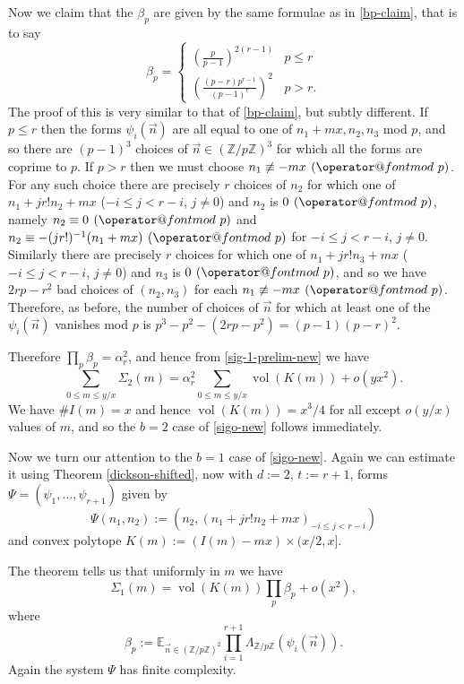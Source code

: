 \documentclass[12pt]{amsart}
\makeatletter
\numberwithin{equation}{section}  %
\theoremstyle{remark}
\theoremstyle{plain}
\numberwithin{equation}{section}
\newcommand{\Z}{\mathbb{Z}}
\newcommand{\E}{\mathbb{E}}  %
\renewcommand{\pmod}[1]{\allowbreak\mkern7mu({\operator@font mod}\,\,#1)}
\renewcommand{\leq}{\leqslant}
\renewcommand{\(}{\left(}
\renewcommand{\)}{\right)}
\newcommand{\pfrac}[2]{\left(\frac{#1}{#2}\right)}  %
\newcommand{\vect}[1]{{\ensuremath{\vec{#1}}}}
\newcommand{\vol}{\operatorname{vol}}
\makeatother
\begin{document}
Now we claim that the $\beta_p$ are given by the same formulae as in \eqref{bp-claim}, that is to say
\[ \beta_p = \left\{ \begin{array}{ll} (\frac{p}{p-1})^{2(r - 1)} & p
  \leq r \\ \pfrac{(p-r)p^{r-1}}{(p-1)^r}^2 & p > r.\end{array}
\right. \]
The proof of this is very similar to that of \eqref{bp-claim}, but subtly different. If $p \leq r$ then the forms $\psi_i(\vect{n})$ are all equal to one of $n_1+ mx,n_2,n_3$ mod $p$, and so there are $(p-1)^3$ choices of $\vect{n} \in (\Z/p\Z)^3$ for which all the forms are coprime to $p$. If $p > r$ then we must choose $n_1 \not\equiv -mx \pmod{p}$. For any such choice there are precisely $r$ choices of $n_2$ for which one of $n_1 + jr! n_2 + mx$ ($-i \leq j < r - i$, $j \neq 0$) and $n_2$ is $0 \pmod{p}$, namely $n_2 \equiv 0\pmod{p}$ and $n_2 \equiv -(jr!)^{-1} (n_1 + mx) \pmod{p}$ for $-i \leq j < r-i$, $j \neq 0$. Similarly there are precisely $r$ choices for which one of $n_1 + jr! n_3 + mx$ ($-i \leq j < r-i$, $j \neq 0$) and $n_3$ is $0 \pmod{p}$, and so we have $2rp - r^2$ bad choices of $(n_2,n_3)$ for each $n_1 \not\equiv -mx \pmod{p}$. Therefore, as before, the number of choices of $\vect{n}$ for which at least one of the $\psi_i(\vect{n})$ vanishes mod $p$ is $p^3 - p^2 - (2rp - p^2) = (p-1)(p-r)^2$.

Therefore $\prod_p \beta_p = \alpha_r^2$, and hence from \eqref{sig-1-prelim-new} we have
\[ \sum_{0 \leq m \leq y/x} \Sigma_2(m) = \alpha_r^2 \sum_{0 \leq m \leq y/x} \vol(K(m)) + o(y x^2).\] 
We have $\# I(m) = x$ and hence $\vol(K(m)) = x^3/4$ for all except $o(y/x)$ values of $m$, and so the $b=2$ case of \eqref{sigo-new} follows immediately.

Now we turn our attention to the $b=1$ case of \eqref{sigo-new}. Again we can estimate it using Theorem \ref{dickson-shifted}, now with $d := 2$, $t := r+1$, forms $\Psi = (\psi_1,\dots, \psi_{r+1})$ given by 
\[ \Psi(n_1,n_2) := ( n_2, (n_1 + jr! n_2 + mx)_{-i \leq j < r-i})\] and convex polytope $K(m) := (I(m) - mx) \times (x/2,x]$. 

 The theorem tells us that uniformly in $m$ we have
\begin{equation}\label{sig-2-prelim-new} \Sigma_1(m) = \vol(K(m)) \prod_p \beta_p + o(x^2),\end{equation} where 
\[ \beta_p := \E_{\vect{n} \in (\Z/p\Z)^2} \prod_{i = 1}^{r+1} \Lambda_{\Z/p\Z}(\psi_i(\vect{n})).\]
Again the system $\Psi$ has finite complexity. 
\end{document}
